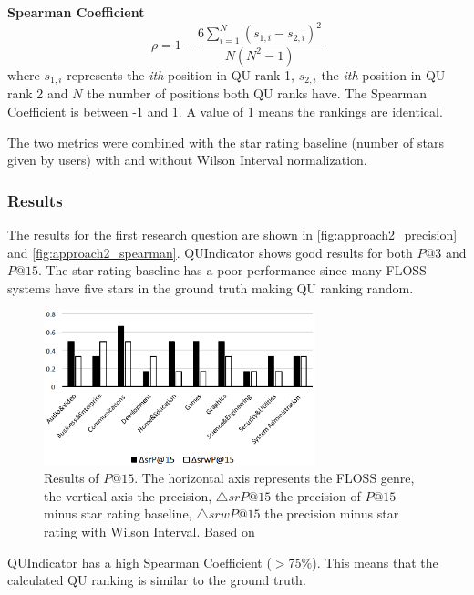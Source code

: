 \textbf{Spearman Coefficient}
\begin{equation*}
    \rho = 1 - \frac{6 \sum_{i=1}^{N} (s_{1, i} - s_{2, i})^2 }{N(N^2 - 1)}
\end{equation*}
where $s_{1, i}$ represents the \textit{ith} position in QU rank 1, $s_{2, i}$ the \textit{ith} position in QU rank 2 and $N$ the number of positions both QU ranks have. The Spearman Coefficient is between -1 and 1. A value of 1 means the rankings are identical.

The two metrics were combined with the star rating baseline (number of stars given by users) with and without Wilson Interval normalization.

\subsubsection*{Results}
The results for the first research question are shown in \autoref{fig:approach2_precision} and \autoref{fig:approach2_spearman}. QUIndicator shows good results for both $P@3$ and $P@15$. The star rating baseline has a poor performance since many FLOSS systems have five stars in the ground truth making QU ranking random.

\begin{figure}
    \centering
    \includegraphics[width=0.7\textwidth]{images/Thema4_Approach2_Precision.png}
    \caption{Results of $P@15$. The horizontal axis represents the FLOSS genre, the vertical axis the precision, $\triangle srP@15$ the precision of $P@15$ minus star rating baseline, $\triangle srwP@15$ the precision minus star rating with Wilson Interval. Based on \cite[Figure 3]{Qian2016}}
    \label{fig:approach2_precision}
\end{figure}

QUIndicator has a high Spearman Coefficient ($>$75\%). This means that the calculated QU ranking is similar to the ground truth.

